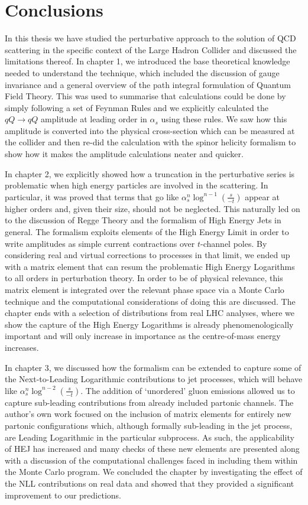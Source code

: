 \chapter{Conclusions}

In this thesis we have studied the perturbative approach to the solution of QCD scattering in the specific context of the Large Hadron Collider and discussed the limitations thereof. In chapter 1, we introduced the base theoretical knowledge needed to understand the technique, which included the discussion of gauge invariance and a general overview of the path integral formulation of Quantum Field Theory. This was used to summarise that calculations could be done by simply following a set of Feynman Rules and we explicitly calculated the $qQ \to qQ$ amplitude at leading order in $\alpha_s$ using these rules. We saw how this amplitude is converted into the physical cross-section which can be measured at the collider and then re-did the calculation with the spinor helicity formalism to show how it makes the amplitude calculations neater and quicker. 

In chapter 2, we explicitly showed how a truncation in the perturbative series is problematic when high energy particles are involved in the scattering. In particular, it was proved that terms that go like $\alpha_s^{n} \log^{n-1}\left(\frac{s}{-t} \right)$ appear at higher orders and, given their size, should not be neglected. This naturally led on to the discussion of Regge Theory and the formalism of High Energy Jets in general. The formalism exploits elements of the High Energy Limit in order to write amplitudes as simple current contractions over $t$-channel poles. By considering real and virtual corrections to processes in that limit, we ended up with a matrix element that can resum the problematic High Energy Logarithms to all orders in perturbation theory. In order to be of physical relevance, this matrix element is integrated over the relevant phase space via a Monte Carlo technique and the computational considerations of doing this are discussed. The chapter ends with a selection of distributions from real LHC analyses, where we show the capture of the High Energy Logarithms is already phenomenologically important and will only increase in importance as the centre-of-mass energy increases. 

In chapter 3, we discussed how the formalism can be extended to capture some of the Next-to-Leading Logarithmic contributions to jet processes, which will behave like $\alpha_s^{n} \log^{n-2}\left(\frac{s}{-t} \right)$. The addition of `unordered' gluon emissions allowed us to capture sub-leading contributions from already included partonic channels. The author's own work focused on the inclusion of matrix elements for entirely new partonic configurations which, although formally sub-leading in the jet process, are Leading Logarithmic in the particular subprocess. As such, the applicability of HEJ has increased and many checks of these new elements are presented along with a discussion of the computational challenges faced in including them within the Monte Carlo program. We concluded the chapter by investigating the effect of the NLL contributions on real data and showed that they provided a significant improvement to our predictions. 

